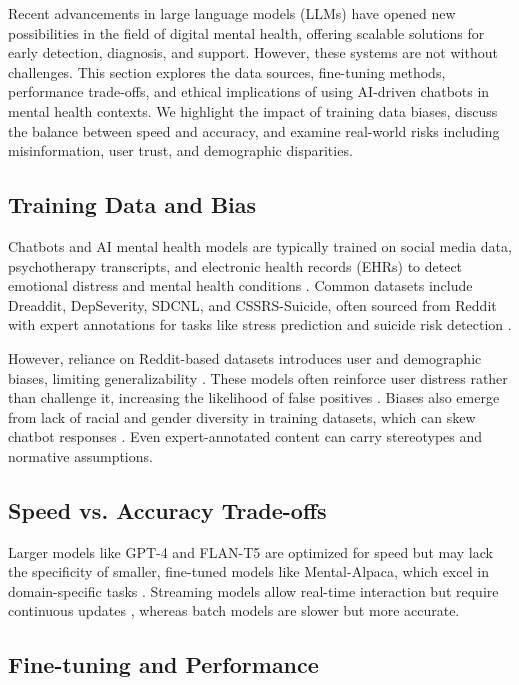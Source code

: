 Recent advancements in large language models (LLMs) have opened new possibilities in the field of digital mental health, offering scalable solutions for early detection, diagnosis, and support. However, these systems are not without challenges. This section explores the data sources, fine-tuning methods, performance trade-offs, and ethical implications of using AI-driven chatbots in mental health contexts. We highlight the impact of training data biases, discuss the balance between speed and accuracy, and examine real-world risks including misinformation, user trust, and demographic disparities.

\subsection{Training Data and Bias}

Chatbots and AI mental health models are typically trained on social media data, psychotherapy transcripts, and electronic health records (EHRs) to detect emotional distress and mental health conditions \cite{arriba2024}. Common datasets include Dreaddit, DepSeverity, SDCNL, and CSSRS-Suicide, often sourced from Reddit with expert annotations for tasks like stress prediction and suicide risk detection \cite{arriba2024}.

However, reliance on Reddit-based datasets introduces user and demographic biases, limiting generalizability \cite{li2023}. These models often reinforce user distress rather than challenge it, increasing the likelihood of false positives \cite{gbollie2023}. Biases also emerge from lack of racial and gender diversity in training datasets, which can skew chatbot responses \cite{arriba2024}. Even expert-annotated content can carry stereotypes and normative assumptions.

\subsection{Speed vs. Accuracy Trade-offs}

Larger models like GPT-4 and FLAN-T5 are optimized for speed but may lack the specificity of smaller, fine-tuned models like Mental-Alpaca, which excel in domain-specific tasks \cite{xu2024}. Streaming models allow real-time interaction but require continuous updates \cite{mcgorry2025}, whereas batch models are slower but more accurate.

\subsection{Fine-tuning and Performance}

